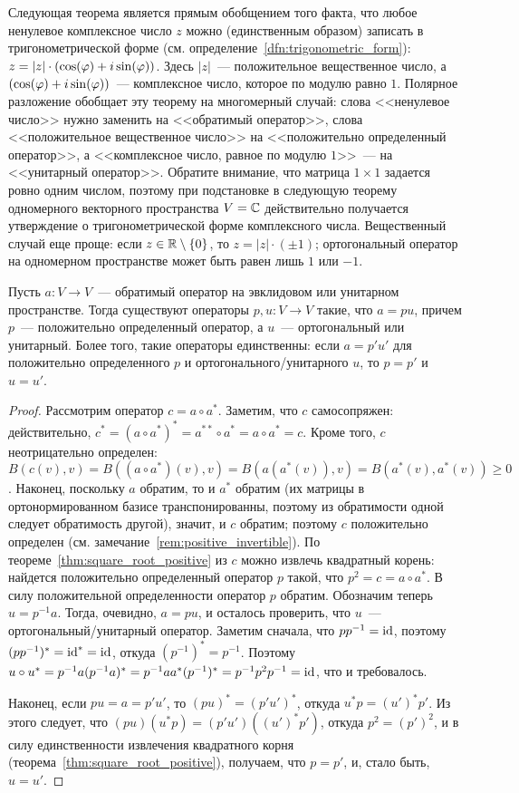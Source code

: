 Следующая теорема является прямым обобщением того факта, что
любое ненулевое комплексное число $z$ можно (единственным образом)
записать в
тригонометрической форме
(см. определение~\ref{dfn:trigonometric_form}):
$z = |z|\cdot (\cos(\varphi)+i\sin(\varphi))$.
Здесь
$|z|$~--- положительное вещественное число, а $(\cos(\varphi) +
i\sin(\varphi))$~--- комплексное число, которое по модулю равно
$1$. Полярное разложение обобщает эту теорему на многомерный случай:
слова <<ненулевое число>> нужно заменить на <<обратимый оператор>>,
слова <<положительное вещественное число>> на <<положительно
определенный оператор>>, а <<комплексное число, равное по модулю
$1$>>~--- на <<унитарный оператор>>. Обратите внимание, что матрица
$1\times 1$ задается ровно одним числом, поэтому при подстановке в
следующую теорему одномерного векторного пространства $V=\mathbb C$
действительно получается утверждение о тригонометрической форме
комплексного числа. Вещественный случай еще проще: если
$z\in\mathbb R\setminus\{0\}$, то $z = |z|\cdot(\pm 1)$; ортогональный
оператор на одномерном пространстве может быть равен лишь $1$ или
$-1$.

\begin{theorem}\label{thm:polar_decomposition}
Пусть $a\colon V\to V$~--- обратимый оператор на эвклидовом или
унитарном пространстве. Тогда существуют операторы $p,u\colon V\to V$
такие, что $a = pu$, причем $p$~--- положительно определенный
оператор, а $u$~--- ортогональный или унитарный. Более того, такие
операторы единственны: если $a=p'u'$ для положительно определенного
$p$ и ортогонального/унитарного $u$, то $p=p'$ и $u=u'$.
\end{theorem}
\begin{proof}
Рассмотрим оператор $c = a\circ a^*$. Заметим, что $c$ самосопряжен:
действительно, $c^* = (a\circ a^*)^* = a^{**}\circ a^* = a\circ a^* =
c$.
Кроме того, $c$ неотрицательно определен:
$B(c(v),v) = B((a\circ a^*)(v),v) = B(a(a^*(v)),v) =
B(a^*(v),a^*(v))\geq 0$.
Наконец, поскольку $a$ обратим, то и $a^*$ обратим (их матрицы в
ортонормированном базисе транспонированны, поэтому из обратимости
одной следует обратимость другой), значит, и $c$ обратим; поэтому $c$
положительно определен (см. замечание~\ref{rem:positive_invertible}).
По теореме~\ref{thm:square_root_positive} из $c$ можно извлечь
квадратный корень: найдется положительно определенный оператор $p$
такой, что $p^2 = c = a\circ a^*$. В силу положительной определенности
оператор $p$ обратим.
Обозначим теперь $u = p^{-1}a$. Тогда, очевидно, $a = pu$, и осталось
проверить, что $u$~--- ортогональный/унитарный оператор.
Заметим сначала, что $pp^{-1} = \operatorname{id}$, поэтому
$(pp^{-1})^* = \operatorname{id}^* = \operatorname{id}$, откуда $(p^{-1})^* = p^{-1}$.
Поэтому $u\circ u^* = p^{-1}a(p^{-1}a)^* = p^{-1}aa^*(p^{-1})^* =
p^{-1}p^2 p^{-1} = \operatorname{id}$, что и требовалось.

Наконец, если $pu = a = p'u'$, то $(pu)^* = (p'u')^*$, откуда $u^* p =
(u')^*p'$. Из этого следует, что
$(pu)(u^*p) = (p'u')((u')^*p')$, откуда $p^2 = (p')^2$, и в силу
единственности извлечения квадратного корня
(теорема~\ref{thm:square_root_positive}), получаем, что
$p=p'$, и, стало быть, $u=u'$.
\end{proof}

